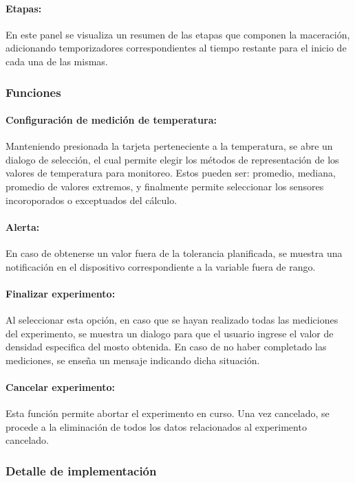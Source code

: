            \paragraph{Etapas:}
            En este panel se visualiza un resumen de las etapas que componen la maceración, adicionando temporizadores correspondientes al tiempo restante para el inicio de cada una de las mismas.
            
            \subsubsection{Funciones}
            \paragraph{Configuración de medición de temperatura:} Manteniendo presionada la tarjeta perteneciente a la temperatura, se abre un dialogo de selección, el cual permite elegir los métodos de representación de los valores de temperatura para monitoreo. Estos pueden ser: promedio, mediana, promedio de valores extremos, y finalmente permite seleccionar los sensores incoroporados o exceptuados del cálculo.
            \paragraph{Alerta:} 
            En caso de obtenerse un valor fuera de la tolerancia planificada, se muestra una notificación en el dispositivo correspondiente a la variable fuera de rango. 
            \paragraph{Finalizar experimento:}
            Al seleccionar esta opción, en caso que se hayan realizado todas las mediciones del experimento, se muestra un dialogo para que el usuario ingrese el valor de densidad especifica del mosto obtenida. En caso de no haber completado las mediciones, se enseña un mensaje indicando dicha situación.
            \paragraph{Cancelar experimento:} 
            Esta función permite abortar el experimento en curso. Una vez cancelado, se procede a la eliminación de todos los datos relacionados al experimento cancelado.
            
            \subsubsection{Detalle de implementación}
            